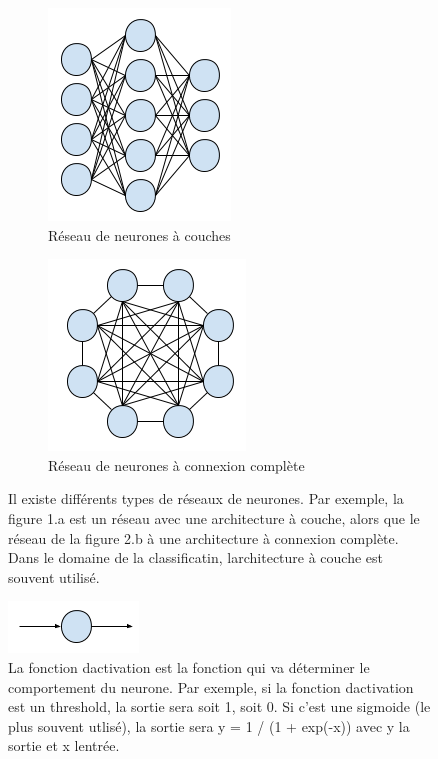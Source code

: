 \documentclass[11pt]{sdm}
\begin{document}
		\bigbreak

		\begin{figure}[!ht]
			\centering
			\begin{subfigure}{0.45\textwidth}
				\centering	
				\includegraphics[scale=0.7,natwidth=183,natheight=213]{figures/neuralNetworkLayers.png}
				\caption{R\'eseau de neurones \`a couches}
				\label{fig:nnl}
			\end{subfigure}
			\hspace*{\fill}
			\begin{subfigure}{0.45\textwidth}	
				\centering
				\includegraphics[scale=0.7,natwidth=198,natheight=192]{figures/neuralNetworkCompleteConnexion.png}
				\caption{R\'eseau de neurones \`a connexion compl\`ete}
				\label{fig:nnc}
			\end{subfigure}
			\caption{Il existe diff\'erents types de r\'eseaux de neurones. Par exemple, la figure 1.a est un r\'eseau avec une architecture \`a couche, alors que le r\'eseau de la figure 2.b \`a une architecture \`a connexion compl\`ete. Dans le domaine de la classificatin, l\textquotesingle architecture \`a couche est souvent utilis\'e.}
			\label{fig:neuralNetwork}
		\end{figure}

		\bigbreak

		\begin{figure}[!ht]
			\centering
			\includegraphics[natwidth=131,natheight=52]{figures/neural.png}
			\caption{La fonction d\textquotesingle activation est la fonction qui va d\'eterminer le comportement du neurone. Par exemple, si la fonction d\textquotesingle activation est un threshold, la sortie sera soit 1, soit 0. Si c’est une sigmoide (le plus souvent utlis\'e), la sortie sera y = 1 / (1 + exp(-x)) avec y la sortie et x l\textquotesingle entr\'ee.}
			\label{fig:neural}
		\end{figure}
	
\end{document}
